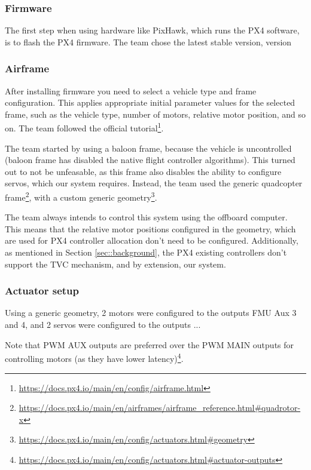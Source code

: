 \documentclass[a4paper]{article}
\begin{document}
\subsubsection{Firmware}

The first step when using hardware like PixHawk, which runs the PX4 software, is to flash the PX4 firmware. 
The team chose the latest stable version, version %

\subsubsection{Airframe}

After installing firmware you need to select a vehicle type and frame configuration. 
This applies appropriate initial parameter values for the selected frame, such as the vehicle type, number of motors, relative motor position, and so on. 
The team followed the official tutorial\footnote{\url{https://docs.px4.io/main/en/config/airframe.html}}. 

The team started by using a baloon frame, because the vehicle is uncontrolled (baloon frame has disabled the native flight controller algorithms). 
This turned out to not be unfeasable, as this frame also disables the ability to configure servos, which our system requires. 
Instead, the team used the generic quadcopter frame\footnote{\url{https://docs.px4.io/main/en/airframes/airframe_reference.html\#quadrotor-x}}, with a custom generic geometry\footnote{\url{https://docs.px4.io/main/en/config/actuators.html\#geometry}}. 

The team always intends to control this system using the offboard computer. This means that the relative motor positions configured in the geometry, which are used for PX4 controller allocation don't need to be configured. Additionally, as mentioned in Section \ref{sec::background}, the PX4 existing controllers don't support the TVC mechanism, and by extension, our system. 

\subsubsection{Actuator setup}

Using a generic geometry, 2 motors were configured to the outputs FMU Aux 3 and 4, and 2 servos were configured to the outputs ... %

Note that PWM AUX outputs are preferred over the PWM MAIN outputs for controlling motors (as they have lower latency)\footnote{\url{https://docs.px4.io/main/en/config/actuators.html\#actuator-outputs}}. 
\end{document}
